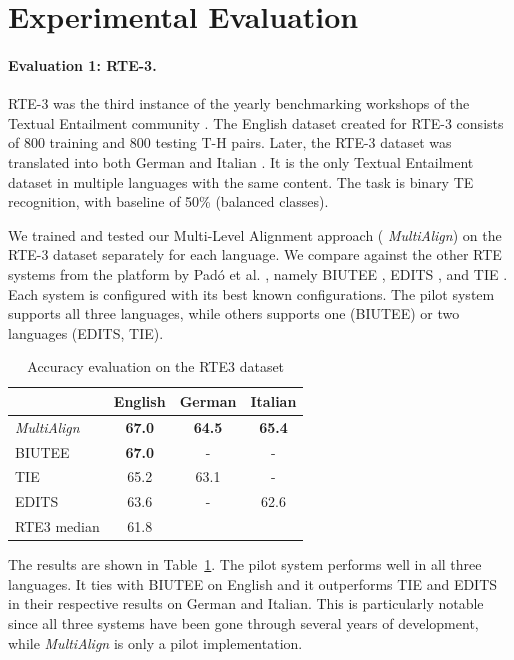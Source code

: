 \documentclass[11pt,letterpaper]{article}
\begin{document}
\section{Experimental Evaluation} 
 
\paragraph{Evaluation 1: RTE-3.}
RTE-3 was the third instance of the yearly benchmarking workshops of
the Textual Entailment community
\cite{giampiccolo07:_third_pascal_recog_textual_entail_chall}. The
English dataset created for RTE-3 consists of 800 training and 800
testing T-H pairs. Later, the RTE-3 dataset was translated into both
German and Italian \cite{Magnini:2014}. %
It is the only Textual Entailment dataset in multiple languages with
the same content. The task is binary TE recognition, with baseline of
50\% (balanced classes).

We trained and tested our Multi-Level Alignment approach ({\em
  MultiAlign}) on the RTE-3 dataset separately for each language. We
compare against the other RTE systems from the platform by Pad\'o et
al. , namely BIUTEE \cite{Stern:2012}, EDITS
\cite{Kouylekov:2010}, and TIE \cite{Wang:2009}. Each system is
configured with its best known configurations. The pilot system
supports all three languages, while others supports one (BIUTEE) or
two languages (EDITS, TIE).

\begin{table}[t!]
\centering
\small
\begin{tabular}{l|ccc}
          &   English   &   German   &   Italian \\
\hline
{\em MultiAlign}&   \textbf{67.0}      &   \textbf{64.5}    &  \textbf{65.4}  \\
BIUTEE        &   \textbf{67.0}      &     -       &     -    \\
TIE           &   65.2       &   63.1    &     -    \\ 
EDITS         &   63.6      &     -       &  62.6  \\ \hline
RTE3 median   &   61.8      &             &          \\

\end{tabular}
\caption{Accuracy evaluation on the RTE3 dataset}
\label{table:rte3}
\end{table}

The results are shown in Table~\ref{table:rte3}. The pilot system
performs well in all three languages. It ties with BIUTEE on English
and it outperforms TIE and EDITS in their respective results on German
and Italian. This is particularly notable since all three systems have
been gone through several years of development, while
{\em MultiAlign} is only a pilot implementation.
\end{document}
